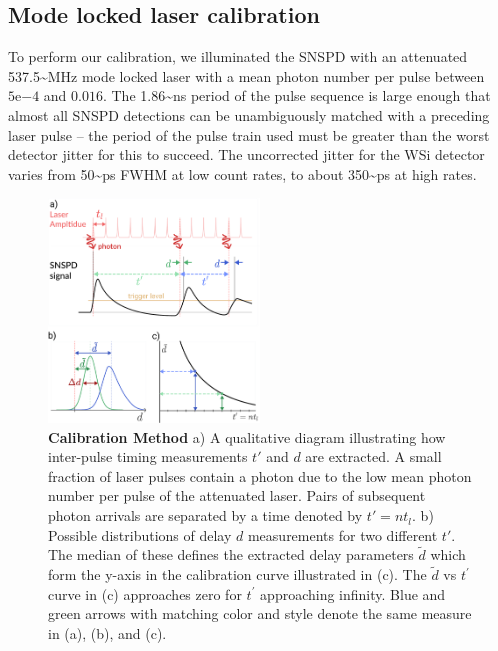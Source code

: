 \documentclass[11pt]{caltech_thesis} %
\begin{document}
\hypertarget{mode-locked-laser-calibration}{%
\subsection{Mode locked laser
calibration}\label{mode-locked-laser-calibration}}

To perform our calibration, we illuminated the SNSPD with an attenuated
537.5\textasciitilde MHz mode locked laser with a mean photon number per
pulse between $5\mathrm{e}{-4}$ and $0.016$. The 1.86\textasciitilde ns
period of the pulse sequence is large enough that almost all SNSPD
detections can be unambiguously matched with a preceding laser pulse --
the period of the pulse train used must be greater than the worst
detector jitter for this to succeed. The uncorrected jitter for the WSi
detector varies from 50\textasciitilde ps FWHM at low count rates, to
about 350\textasciitilde ps at high rates.

\hypertarget{fig:jitterate_explain}{%
\begin{figure}
\centering
\includegraphics[width=0.5\textwidth,height=\textheight]{chapter_02/figs_02/jitterate_explain_light.pdf}
\caption[{Calibration method for extracing t' vs
delay}]{\textbf{Calibration Method} a) A qualitative diagram
illustrating how inter-pulse timing measurements $t'$ and $d$ are
extracted. A small fraction of laser pulses contain a photon due to the
low mean photon number per pulse of the attenuated laser. Pairs of
subsequent photon arrivals are separated by a time denoted by
$t' = n t_l$. b) Possible distributions of delay $d$ measurements for
two different $t'$. The median of these defines the extracted delay
parameters $\tilde{d}$ which form the y-axis in the calibration curve
illustrated in (c). The $\tilde{d}$ vs $t^\prime$ curve in (c)
approaches zero for $t^\prime$ approaching infinity. Blue and green
arrows with matching color and style denote the same measure in (a),
(b), and (c).}
\label{fig:jitterate_explain}
\end{figure}
}
\end{document}
